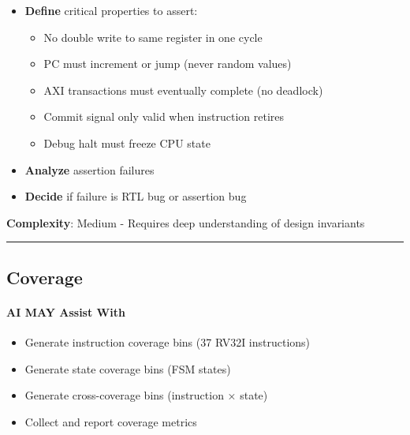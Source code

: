 \begin{record}

\begin{itemize}
\tightlist
\item
  \textbf{Define} critical properties to assert:

  \begin{itemize}
  \tightlist
  \item
    No double write to same register in one cycle
  \item
    PC must increment or jump (never random values)
  \item
    AXI transactions must eventually complete (no deadlock)
  \item
    Commit signal only valid when instruction retires
  \item
    Debug halt must freeze CPU state
  \end{itemize}
\item
  \textbf{Analyze} assertion failures
\item
  \textbf{Decide} if failure is RTL bug or assertion bug
\end{itemize}

\textbf{Complexity}: \partialmark{} Medium - Requires deep understanding
of design invariants

\begin{center}\rule{0.5\linewidth}{0.5pt}\end{center}

\end{record}

\subsection{Coverage}\label{cr:status:phase1-ai-human-responsibilities:coverage}

\paragraph{\texorpdfstring{\ok{} AI MAY Assist
With}{ AI MAY Assist With}}\label{cr:status:phase1-ai-human-responsibilities:white-check-mark-ai-may-assist-with-17}

\begin{record}

\begin{itemize}
\tightlist
\item
  Generate instruction coverage bins (37 RV32I instructions)
\item
  Generate state coverage bins (FSM states)
\item
  Generate cross-coverage bins (instruction × state)
\item
  Collect and report coverage metrics
\end{itemize}

\end{record}


